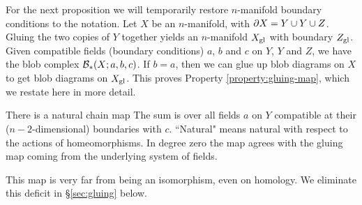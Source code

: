 
For the next proposition we will temporarily restore $n$-manifold boundary
conditions to the notation. Let $X$ be an $n$-manifold, with $\partial X = Y \cup Y \cup Z$.
Gluing the two copies of $Y$ together yields an $n$-manifold $X_\mathrm{gl}$
with boundary $Z_\mathrm{gl}$.
Given compatible fields (boundary conditions) $a$, $b$ and $c$ on $Y$, $Y$ and $Z$,
we have the blob complex ${\mathcal B}_*(X; a, b, c)$.
If $b = a$, then we can glue up blob diagrams on
$X$ to get blob diagrams on $X_\mathrm{gl}$.
This proves Property \ref{property:gluing-map}, which we restate here in more detail.

\begin{prop} \label{blob-gluing}
There is a natural chain map
The sum is over all fields $a$ on $Y$ compatible at their
($n{-}2$-dimensional) boundaries with $c$.
``Natural" means natural with respect to the actions of homeomorphisms.
In degree zero the map agrees with the gluing map coming from the underlying system of fields.
\end{prop}

This map is very far from being an isomorphism, even on homology.
We eliminate this deficit in \S\ref{sec:gluing} below.
